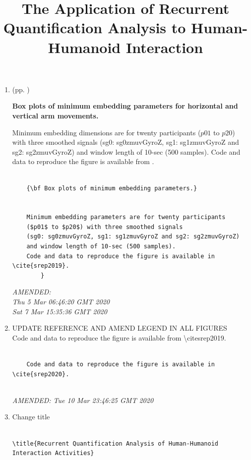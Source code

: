 \documentclass[10pt]{article}
\begin{document}
\begin{enumerate}
\item  (pp. ) 

	{\bf Box plots of minimum embedding parameters for horizontal and vertical arm movements.} 

	Minimum embedding dimensions are for twenty participants 
	($p01$ to $p20$) with three smoothed signals 
	(sg0: sg0zmuvGyroZ, sg1: sg1zmuvGyroZ and sg2: sg2zmuvGyroZ)
	and window length of 10-sec (500 samples).
	Code and data to reproduce the figure is available from \cite{srep2019}.
        

\begin{verbatim}

	{\bf Box plots of minimum embedding parameters.}


	Minimum embedding parameters are for twenty participants 
	($p01$ to $p20$) with three smoothed signals 
	(sg0: sg0zmuvGyroZ, sg1: sg1zmuvGyroZ and sg2: sg2zmuvGyroZ)
	and window length of 10-sec (500 samples).
	Code and data to reproduce the figure is available in \cite{srep2019}.
        }

\end{verbatim}
	\textit{
	AMENDED: \\ 
Thu  5 Mar 06:46:20 GMT 2020 \\
Sat  7 Mar 15:35:36 GMT 2020
	}
	\\



\item  UPDATE REFERENCE AND AMEND LEGEND IN ALL FIGURES \\

	Code and data to reproduce the figure is available from \textbackslash cite{srep2019}.

\begin{verbatim}

	Code and data to reproduce the figure is available in \cite{srep2020}.


\end{verbatim}
	\textit{
	AMENDED: 
Tue 10 Mar 23:46:25 GMT 2020
	}
	\\



\item  Change title 

\title{The Application of Recurrent Quantification Analysis 
to Human-Humanoid Interaction}

\begin{verbatim}

\title{Recurrent Quantification Analysis of Human-Humanoid Interaction Activities}


\end{verbatim}
\end{enumerate}
\end{document}
